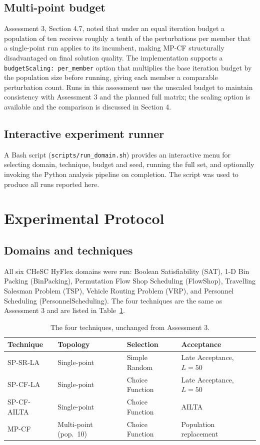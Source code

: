 \documentclass[11pt,a4paper]{article}
\begin{document}
\subsection{Multi-point budget}

Assessment 3, Section 4.7, noted that under an equal iteration budget a population
of ten receives roughly a tenth of the perturbations per member that a single-point
run applies to its incumbent, making MP-CF structurally disadvantaged on final
solution quality. The implementation supports a \texttt{budgetScaling: per\_member}
option that multiplies the base iteration budget by the population size before
running, giving each member a comparable perturbation count. Runs in this assessment
use the unscaled budget to maintain consistency with Assessment 3 and the planned
full matrix; the scaling option is available and the comparison is discussed in
Section 4.

\subsection{Interactive experiment runner}

A Bash script (\texttt{scripts/run\_domain.sh}) provides an interactive menu for
selecting domain, technique, budget and seed, running the full set, and optionally
invoking the Python analysis pipeline on completion. The script was used to produce
all runs reported here.

\section{Experimental Protocol}

\subsection{Domains and techniques}

All six CHeSC HyFlex domains were run: Boolean Satisfiability (SAT), 1-D Bin
Packing (BinPacking), Permutation Flow Shop Scheduling (FlowShop), Travelling
Salesman Problem (TSP), Vehicle Routing Problem (VRP), and Personnel Scheduling
(PersonnelScheduling). The four techniques are the same as Assessment 3 and are
listed in Table~\ref{tab:techniques}.

\begin{table}[h]
\centering
\begin{tabular}{llll}
\toprule
Technique & Topology & Selection & Acceptance \\
\midrule
SP-SR-LA    & Single-point   & Simple Random       & Late Acceptance, $L=50$ \\
SP-CF-LA    & Single-point   & Choice Function     & Late Acceptance, $L=50$ \\
SP-CF-AILTA & Single-point   & Choice Function     & AILTA \\
MP-CF       & Multi-point (pop.\ 10) & Choice Function & Population replacement \\
\bottomrule
\end{tabular}
\caption{The four techniques, unchanged from Assessment 3.}
\label{tab:techniques}
\end{table}
\end{document}
